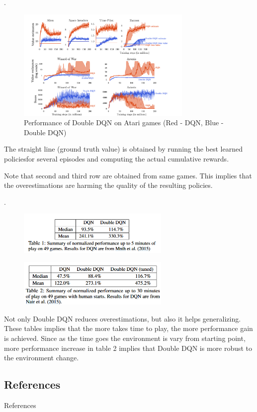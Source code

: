 \documentclass[8pt]{beamer}
\begin{document}
\begin{frame}{.}
    \begin{figure}
        \includegraphics[width=0.75\textwidth]{Figure3.png}
        \caption{Performance of Double DQN on Atari games (Red - DQN, Blue - Double DQN)}
    \end{figure}

    The straight line (ground truth value) is obtained by running the best learned policiesfor several episodes and computing the actual cumulative rewards.

    Note that second and third row are obtained from same games.
    This implies that the overestimations are harming the quality of the resulting policies.
\end{frame}

\begin{frame}{.}
    \begin{figure}
        \includegraphics[width=0.65\textwidth]{Table1.png}
    \end{figure}
    \begin{figure}
        \includegraphics[width=0.65\textwidth]{Table2.png}
    \end{figure}
    Not only Double DQN reduces overestimations, but also it helps generalizing.
    These tables implies that the more takes time to play, the more performance gain is achieved.
    Since as the time goes the environment is vary from starting point, more performance increase in table 2 implies that Double DQN is more robust to the environment change.
\end{frame}

\subsection{References}
\begin{frame}[allowframebreaks]{References}
  \printbibliography
\end{frame}
\end{document}
